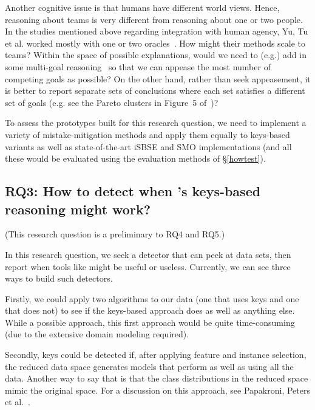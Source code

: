   
  Another cognitive issue is that humans have different world views. Hence,
  reasoning about teams is very different from reasoning about one or two people.
  In the studies
 mentioned above regarding integration with
 human agency,
  Yu, Tu et al. worked mostly with one or two oracles~\cite{zhe19,tu20}. 
  How might their methods scale to teams? Within the space
  of possible explanations, would we need to
  (e.g.) add in some multi-goal reasoning~\cite{harman2001search} so that
  we can appease the most number of competing goals
  as possible? On the other hand, rather than seek
  appeasement, it is better to report
  separate sets of conclusions where each set
  satisfies a different set of goals
  (e.g. see the Pareto clusters
  in Figure~5 of~\cite{veerappa2011understanding})?
  
  To assess the prototypes built for this research question, we need to implement a
  variety of mistake-mitigation methods and apply them equally to keys-based
  variants as well as   state-of-the-art iSBSE and SMO implementations 
  (and all these would be evaluated using the evaluation methods of \S\ref{howtest}).
  
  
 
 
\subsection{RQ3: How to detect when {\IT}'s  keys-based reasoning might work?}

(This research question is a preliminary to RQ4 and RQ5.)

In this research question,  we seek a detector that can peek
at data sets, then report when tools like {\IT} might be useful or useless.
Currently, we can see three ways to build such detectors.

Firstly, we could apply two algorithms to our data (one that uses
keys and one that does not) to see if the keys-based approach does
as well as anything else. While a possible approach, this first approach would be quite
time-consuming (due to the extensive domain modeling required).
 


 Secondly, keys could be detected if,
 after applying feature and instance selection,
  the reduced data space generates models that perform as well
 as using all the data. Another way to say that is that the
 class distributions in the reduced space mimic the original space. For a discussion on this approach, see
 Papakroni, Peters et al.~\cite{peters2015lace2,papakroni2013data}.
 
